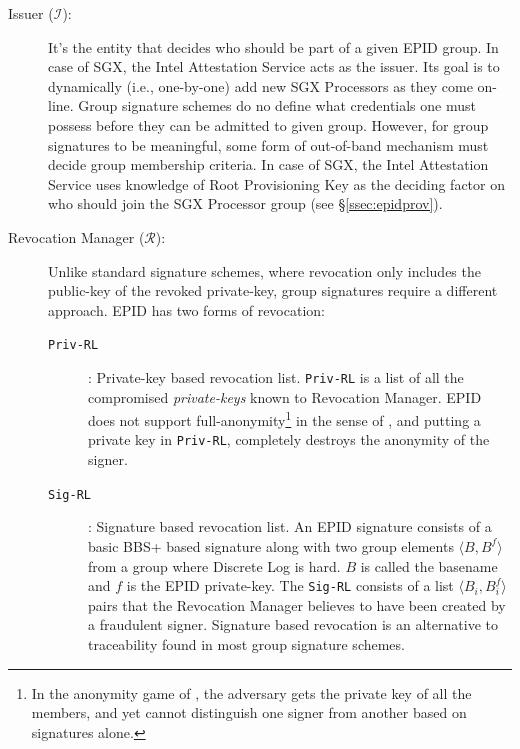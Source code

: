 \documentclass[letterpaper]{article}
\newcommand{\secref}[1]{\S\ref{#1}}
\begin{document}
  \begin{description}
  \item [Issuer ($\mathcal{I}$):] It's the entity that decides who
    should be part of a given EPID group. In case of SGX, the Intel
    Attestation Service acts as the issuer. Its goal is to dynamically
    (i.e., one-by-one) add new SGX Processors as they come
    on-line. Group signature schemes do no define what credentials one
    must possess before they can be admitted to given group. However,
    for group signatures to be meaningful, some form of out-of-band
    mechanism must decide group membership criteria. In case of SGX,
    the Intel Attestation Service uses knowledge of Root Provisioning
    Key as the deciding factor on who should join the SGX Processor
    group (see \secref{ssec:epidprov}).

  \item[Revocation Manager ($\mathcal{R}$):] Unlike standard signature
    schemes, where revocation only includes the public-key of the
    revoked private-key, group signatures require a different
    approach. EPID has two forms of revocation:

    \begin{description}
    \item[\texttt{Priv-RL}]: Private-key based revocation list.
      \texttt{Priv-RL} is a list of all the compromised
      \textit{private-keys} known to Revocation Manager. EPID does not
      support full-anonymity\footnote{In the \textsf{anonymity} game
        of \cite{BMW03}, the adversary gets the private key of all the
        members, and yet cannot distinguish one signer from another
        based on signatures alone.} in the sense of \cite{BMW03}, and
      putting a private key in \texttt{Priv-RL}, completely destroys
      the anonymity of the signer.
      
      \item[\texttt{Sig-RL}]: Signature based revocation list. An EPID
        signature consists of a basic BBS+ \cite{bbsplus, bbs} based
        signature along with two group elements $\langle B, B^f
        \rangle $ from a group where Discrete Log is hard. $B$ is
        called the basename and $f$ is the EPID private-key. The
        \texttt{Sig-RL} consists of a list $\langle B_i, B_i^f
        \rangle$ pairs that the Revocation Manager believes to have
        been created by a fraudulent signer. Signature based
        revocation is an alternative to traceability found in most
        group signature schemes.
    \end{description}


\end{description}
\end{document}
